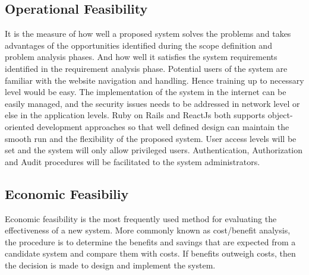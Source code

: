 \subsection{Operational Feasibility}
It is the measure of how well a proposed system solves the problems and takes advantages of
the opportunities identified during the scope definition and problem analysis phases. And
how well it satisfies the system requirements identified in the requirement analysis phase.
Potential users of the system are familiar with the website navigation and handling. Hence
training up to necessary level would be easy. The implementation of the system in the
internet can be easily managed, and the security issues needs to be addressed in network level
or else in the application levels. Ruby on Rails and ReactJs both supports object-oriented
development approaches so that well defined design can maintain the smooth run and the
flexibility of the proposed system. User access levels will be set and the system will only
allow privileged users. Authentication, Authorization and Audit procedures will be facilitated
to the system administrators.

\subsection{Economic Feasibiliy}
Economic feasibility is the most frequently used method for evaluating the effectiveness of a new
system. More commonly known as cost/benefit analysis, the procedure is to determine the benefits
and savings that are expected from a candidate system and compare them with costs. If benefits
outweigh costs, then the decision is made to design and implement the system.

